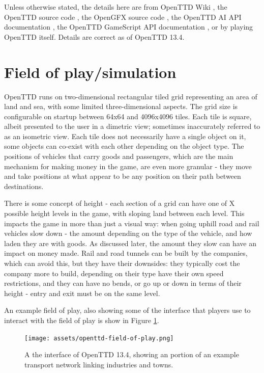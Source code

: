 \documentclass[logo,msc,dsti]{infthesis}    %
\begin{document}
Unless otherwise stated, the details here are from OpenTTD Wiki \cite{OpenTTDWiki}, the OpenTTD source code \cite{OpenTTDSource}, the OpenGFX source code \cite{OpenGFXSource}, the OpenTTD AI API documentation \cite{OpenTTDAIAPIDocs}, the OpenTTD GameScript API documentation \cite{OpenTTDGSAPIDocs}, or by playing OpenTTD itself. Details are correct as of OpenTTD 13.4.

\section{Field of play/simulation}

OpenTTD runs on two-dimensional rectangular tiled grid representing an area of land and sea, with some limited three-dimensional aspects. The grid size is configurable on startup between 64x64 and 4096x4096 tiles. Each tile is square, albeit presented to the user in a dimetric view; sometimes inaccurately referred to as an isometric view. Each tile does not necessarily have a single object on it, some objects can co-exist with each other depending on the object type. The positions of vehicles that carry goods and passengers, which are the main mechanism for making money in the game, are even more granular - they move and take positions at what appear to be any position on their path between destinations.

There is some concept of height - each section of a grid can have one of X possible height levels in the game, with sloping land between each level. This impacts the game in more than just a visual way: when going uphill road and rail vehicles slow down - the amount depending on the type of the vehicle, and how laden they are with goods. As discussed later, the amount they slow can have an impact on money made. Rail and road tunnels can be built by the companies, which can avoid this, but they have their downsides: they typically cost the company more to build, depending on their type have their own speed restrictions, and they can have no bends, or go up or down in terms of their height - entry and exit must be on the same level.

An example field of play, also showing some of the interface that players use to interact with the field of play is show in Figure \ref{figure:openttd-field-of-play}.

\begin{figure}[h]
\centering
\texttt{[image: assets/openttd-field-of-play.png]}
\caption{A the interface of OpenTTD 13.4, showing an portion of an example transport network linking industries and towns.}
\label{figure:openttd-field-of-play}
\end{figure}
\end{document}
